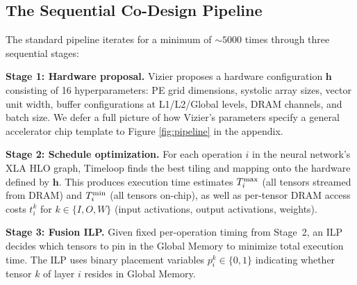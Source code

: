 \subsection{The Sequential Co-Design Pipeline}
\label{sec:background_pipeline}
The standard pipeline iterates for a minimum of $\sim 5000$ times through three sequential stages: 

\textbf{Stage 1: Hardware proposal.}
Vizier proposes a hardware configuration $\mathbf{h}$ consisting of 16 hyperparameters: PE grid dimensions, systolic array sizes, vector unit width, buffer configurations at L1/L2/Global levels, DRAM channels, and batch size. We defer a full picture of how Vizier's parameters specify a general accelerator chip template to Figure \ref{fig:pipeline} in the appendix.


\textbf{Stage 2: Schedule optimization.}
For each operation $i$ in the neural network's XLA HLO graph, Timeloop finds the best tiling and mapping onto the hardware defined by $\mathbf{h}$. This produces execution time estimates $T^{\max}_i$ (all tensors streamed from DRAM) and $T^{\min}_i$ (all tensors on-chip), as well as per-tensor DRAM access costs $t_i^k$ for $k \in \{I, O, W\}$ (input activations, output activations, weights).

\textbf{Stage 3: Fusion ILP.}
Given fixed per-operation timing from Stage~2, an ILP decides which tensors to pin in the Global Memory to minimize total execution time. The ILP uses binary placement variables $p_i^k \in \{0,1\}$ indicating whether tensor $k$ of layer $i$ resides in Global Memory.

